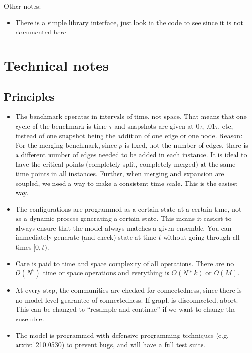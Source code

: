 \documentclass{article}
\begin{document}
Other notes:
\begin{itemize}
\item There is a simple library interface, just look in the code to
  see since it is not documented here.
\end{itemize}




\section{Technical notes}
\label{sec:technical}

\subsection{Principles}
\label{sec:principles}

\begin{itemize}
\item The benchmark operates in intervals of time, not space.  That
  means that one cycle of the benchmark is time $\tau$ and snapshots
  are given at $0\tau$, $.01\tau$, etc, instead of one snapshot being
  the addition of one edge or one node.  Reason: For the merging
  benchmark, since $p$ is fixed, not the number of edges, there is a
  different number of edges needed to be added in each instance.  It is ideal to have
  the critical points (completely split, completely merged) at the
  same time points in all instances.  Further, when merging and
  expansion are coupled, we need a way to make a consistent time
  scale.  This is the easiest way.
\item The configurations are programmed as a certain state at a certain
  time, not as a dynamic process generating a certain state.  This
  means it easiest to always ensure that the model always matches a
  given ensemble.  You can immediately generate (and check) state at
  time $t$ without going through all times $[0,t)$.
\item Care is paid to time and space complexity of all operations.
  There are no $O(N^2)$ time or space operations and everything is
  $O(N*k)$ or $O(M)$.
\item At every step, the communities are checked for connectedness,
  since there is no model-level guarantee of connectedness.  If graph
  is disconnected, abort.  This can be changed to ``resample and
  continue'' if we want to change the ensemble.
\item The model is programmed with defensive programming techniques
  (e.g. arxiv:1210.0530) to prevent bugs, and will have a full test suite.

\end{itemize}
\end{document}
